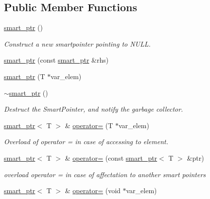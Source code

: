 \subsection*{Public Member Functions}
\begin{DoxyCompactItemize}
\item 
\hypertarget{classsmart__ptr_ae09faa6aeb5dd0f9587174c279410c4c}{\hyperlink{classsmart__ptr_ae09faa6aeb5dd0f9587174c279410c4c}{smart\-\_\-ptr} ()}\label{classsmart__ptr_ae09faa6aeb5dd0f9587174c279410c4c}

\begin{DoxyCompactList}\small\item\em Construct a new smartpointer pointing to N\-U\-L\-L. \end{DoxyCompactList}\item 
\hyperlink{classsmart__ptr_a9a21ea7b2a253280c101b85b31ad2074}{smart\-\_\-ptr} (const \hyperlink{classsmart__ptr}{smart\-\_\-ptr} \&rhs)
\item 
\hyperlink{classsmart__ptr_aa2d4a2bcc8befc68a31d340d97b3b33c}{smart\-\_\-ptr} (T $\ast$var\-\_\-elem)
\item 
\hyperlink{classsmart__ptr_a43518f1c6d475b5d462599780f07b769}{$\sim$smart\-\_\-ptr} ()
\begin{DoxyCompactList}\small\item\em Destruct the Smart\-Pointer, and notify the garbage collector. \end{DoxyCompactList}\item 
\hypertarget{classsmart__ptr_abc00d30772eeb6050f2db0639a80eb5f}{\hyperlink{classsmart__ptr}{smart\-\_\-ptr}$<$ T $>$ \& \hyperlink{classsmart__ptr_abc00d30772eeb6050f2db0639a80eb5f}{operator=} (T $\ast$var\-\_\-elem)}\label{classsmart__ptr_abc00d30772eeb6050f2db0639a80eb5f}

\begin{DoxyCompactList}\small\item\em Overload of operator = in case of accessing to element. \end{DoxyCompactList}\item 
\hypertarget{classsmart__ptr_abf4c44d2c4b0ded71dfa05ded4da6319}{\hyperlink{classsmart__ptr}{smart\-\_\-ptr}$<$ T $>$ \& \hyperlink{classsmart__ptr_abf4c44d2c4b0ded71dfa05ded4da6319}{operator=} (const \hyperlink{classsmart__ptr}{smart\-\_\-ptr}$<$ T $>$ \&ptr)}\label{classsmart__ptr_abf4c44d2c4b0ded71dfa05ded4da6319}

\begin{DoxyCompactList}\small\item\em overload operator = in case of affectation to another smart pointers \end{DoxyCompactList}\item 
\hypertarget{classsmart__ptr_ad7e692635bc33199ee7304d70279852b}{\hyperlink{classsmart__ptr}{smart\-\_\-ptr}$<$ T $>$ \& \hyperlink{classsmart__ptr_ad7e692635bc33199ee7304d70279852b}{operator=} (void $\ast$var\-\_\-elem)}\label{classsmart__ptr_ad7e692635bc33199ee7304d70279852b}


\end{DoxyCompactItemize}
